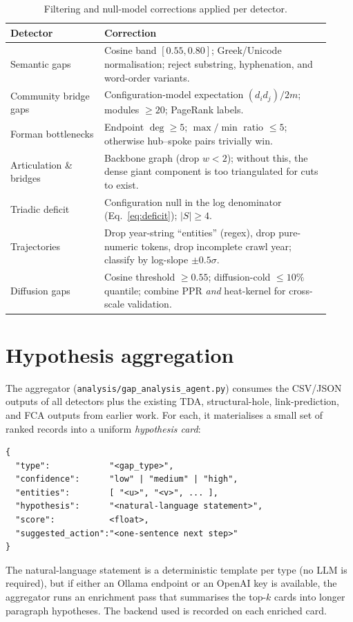 \documentclass[11pt,a4paper]{article}
\newcommand{\code}[1]{\texttt{\small #1}}
\begin{document}
\begin{table}[ht]
\centering
\caption{Filtering and null-model corrections applied per detector.}
\label{tab:filtering}
\small
\begin{tabular}{p{0.27\linewidth}p{0.65\linewidth}}
\toprule
Detector & Correction \\
\midrule
Semantic gaps & Cosine band $[0.55,0.80]$; Greek/Unicode normalisation; reject substring, hyphenation, and word-order variants. \\
Community bridge gaps & Configuration-model expectation $(d_id_j)/2m$; modules $\geq 20$; PageRank labels. \\
Forman bottlenecks & Endpoint $\deg \geq 5$; $\max\!/\min$ ratio $\leq 5$; otherwise hub--spoke pairs trivially win. \\
Articulation \& bridges & Backbone graph (drop $w<2$); without this, the dense giant component is too triangulated for cuts to exist. \\
Triadic deficit & Configuration null in the log denominator (Eq.~\ref{eq:deficit}); $|S|\geq 4$. \\
Trajectories & Drop year-string ``entities'' (regex), drop pure-numeric tokens, drop incomplete crawl year; classify by log-slope $\pm 0.5\sigma$. \\
Diffusion gaps & Cosine threshold $\geq 0.55$; diffusion-cold $\leq 10\%$ quantile; combine PPR \emph{and} heat-kernel for cross-scale validation. \\
\bottomrule
\end{tabular}
\end{table}

\section{Hypothesis aggregation}
\label{sec:agg}

The aggregator (\code{analysis/gap\_analysis\_agent.py}) consumes the CSV/JSON outputs of all detectors plus the existing TDA, structural-hole, link-prediction, and FCA outputs from earlier work. For each, it materialises a small set of ranked records into a uniform \emph{hypothesis card}:
\begin{verbatim}
{
  "type":            "<gap_type>",
  "confidence":      "low" | "medium" | "high",
  "entities":        [ "<u>", "<v>", ... ],
  "hypothesis":      "<natural-language statement>",
  "score":           <float>,
  "suggested_action":"<one-sentence next step>"
}
\end{verbatim}
The natural-language statement is a deterministic template per type (no LLM is required), but if either an Ollama endpoint or an OpenAI key is available, the aggregator runs an enrichment pass that summarises the top-$k$ cards into longer paragraph hypotheses. The backend used is recorded on each enriched card.
\end{document}
